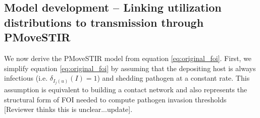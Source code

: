 ﻿\documentclass[11pt]{article}
\begin{document}





\subsection*{Model development -- Linking utilization distributions to transmission through PMoveSTIR}

We now derive the PMoveSTIR model from equation \ref{eq:original_foi}. First, we simplify equation \ref{eq:original_foi} by assuming that the depositing host is always infectious (i.e. $\delta_{I_j(u)}(I)=1$) and shedding pathogen at a constant rate. This assumption is equivalent to building a contact network and also represents the structural form of FOI needed to compute pathogen invasion thresholds \citep{Wilber2022} [Reviewer thinks this is unclear...update].  
\end{document}
